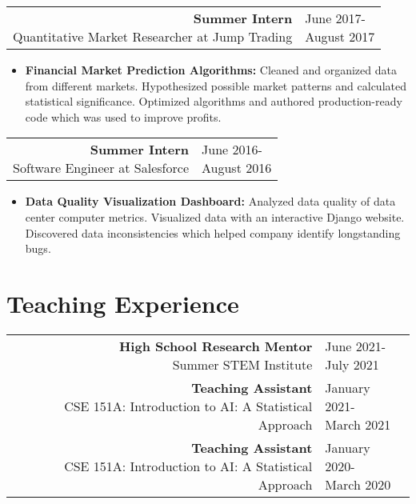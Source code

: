 \documentclass[11pt]{article}
\newcommand{\datewidth}{0.2\textwidth}
\newcommand{\descwidth}{0.755\textwidth}
\begin{document}
\medskip

\begin{tabular}{rl}
  \parbox[t][][t]{\descwidth}{
    \textbf{Summer Intern} \\
    Quantitative Market Researcher at Jump Trading
  } &
  \parbox[t][][t]{\datewidth}{
    \raggedleft June 2017-\\August 2017
  }
\end{tabular}
\begin{itemize}
  \item \textbf{Financial Market Prediction Algorithms:}
  Cleaned and organized data from different markets.
  Hypothesized possible market patterns and calculated statistical significance.
  Optimized algorithms and authored production-ready code which was used to
  improve profits.
\end{itemize}
\medskip

\begin{tabular}{rl}
  \parbox[t][][t]{\descwidth}{
    \textbf{Summer Intern} \\
    Software Engineer at Salesforce
  } &
  \parbox[t][][t]{\datewidth}{
    \raggedleft June 2016-\\August 2016
  }
\end{tabular}
\begin{itemize}
  \item \textbf{Data Quality Visualization Dashboard:}
    Analyzed data quality of data center computer metrics.
    Visualized data with an interactive Django website.
    Discovered data inconsistencies which helped company identify longstanding
    bugs.
\end{itemize}

\section*{Teaching Experience}
\begin{tabular}{rl}
  \parbox[t][][t]{\descwidth}{
    \textbf{High School Research Mentor} \\
    Summer STEM Institute 
  } &
  \parbox[t][][t]{\datewidth}{
    \raggedleft June 2021-\\July 2021
  } \medskip \\
  \parbox[t][][t]{\descwidth}{
    \textbf{Teaching Assistant} \\
    CSE 151A: Introduction to AI: A Statistical Approach 
  } &
  \parbox[t][][t]{\datewidth}{
    \raggedleft January 2021-\\March 2021
  } \medskip \\
  \parbox[t][][t]{\descwidth}{
    \textbf{Teaching Assistant} \\
    CSE 151A: Introduction to AI: A Statistical Approach 
  } &
  \parbox[t][][t]{\datewidth}{
    \raggedleft January 2020-\\March 2020
  }
\end{tabular}
\end{document}
